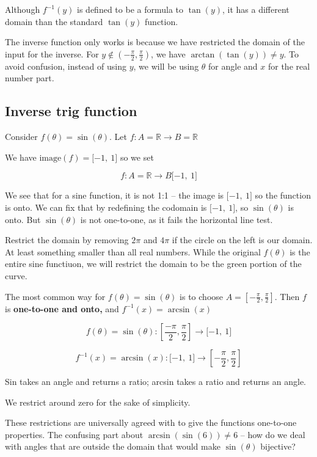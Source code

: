 \documentclass[
]{article}
\begin{document}
Although $f^{- 1}(y)$ is defined to be a formula to $\tan(y)$, it
has a different domain than the standard $\tan(y)$ function.

The inverse function only works is because we have restricted the domain
of the input for the inverse. For
$y \notin \left( - \frac{\pi}{2},\frac{\pi}{2} \right)$, we have
$\arctan\left( \tan(y) \right) \neq y$. To avoid confusion, instead of
using $y$, we will be using $\theta$ for angle and $x$ for the
real number part.


\subsection{Inverse trig function}

Consider $f(\theta) = \sin(\theta)$. Let
$f:A\mathbb{= R \rightarrow}B\mathbb{= R}$

We have $\text{image}(f) = \lbrack - 1,\ 1\rbrack$ so we set

$$f:A\mathbb{= R \rightarrow}B\lbrack - 1,\ 1\rbrack$$

We see that for a sine function, it is not 1:1 -- the image is
$\lbrack - 1,\ 1\rbrack$ so the function is onto. We can fix that by
redefining the codomain is $\lbrack - 1,\ 1\rbrack$, so
$\sin(\theta)$ is onto. But $\sin(\theta)$ is not one-to-one, as it
fails the horizontal line test.

Restrict the domain by removing $2\pi$ and $4\pi$ if the circle on
the left is our domain. At least something smaller than all real
numbers. While the original $f(\theta)$ is the entire sine functiuon,
we will restrict the domain to be the green portion of the curve.

The most common way for $f(\theta) = \sin(\theta)$ is to choose
$A = \left\lbrack - \frac{\pi}{2},\frac{\pi}{2} \right\rbrack$. Then
$f$ is \textbf{one-to-one and onto,} and $f^{- 1}(x) = \arcsin(x)$

$$f(\theta) = \sin(\theta):\left\lbrack \frac{-\pi}{2},\frac{\pi}{2} \right\rbrack \rightarrow \lbrack - 1,\ 1\rbrack$$

$$f^{- 1}(x) = \arcsin(x):\lbrack - 1,\ 1\rbrack \rightarrow \left\lbrack - \frac{\pi}{2},\frac{\pi}{2} \right\rbrack$$

Sin takes an angle and returns a ratio; arcsin takes a ratio and returns
an angle.

We restrict around zero for the sake of simplicity.

These restrictions are universally agreed with to give the functions
one-to-one properties. The confusing part about
$\arcsin\left( \sin(6) \right) \neq 6$ -- how do we deal with angles
that are outside the domain that would make $\sin(\theta)$ bijective?
\end{document}
